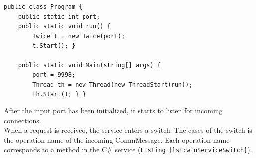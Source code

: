 \documentclass[12pt,a4paper]{article}
\begin{document}
\begin{lstlisting}[caption={Initialize C\# service},label={lst:initWinService}]
public class Program {                                                                                                                                                                                                        
	public static int port;                                                                                                                                                                              
	public static void run() {                                                                                                                                                                                                    
		Twice t = new Twice(port);                                                                                                                                                                       
		t.Start(); }                                                                                                                                                                                                    
                                                                                                                                                                                                             
	public static void Main(string[] args) {
		port = 9998;                                                                                                                                                                             
		Thread th = new Thread(new ThreadStart(run));                                                                                                                                            
		th.Start(); } }
\end{lstlisting}

After the input port has been initialized, it starts to listen for incoming connections.\\
When a request is received, the service enters a switch. The cases of the switch is the operation name of the incoming CommMessage. Each operation name corresponds to a method in the C\# service (\texttt{Listing \ref{lst:winServiceSwitch}}).
\end{document}
